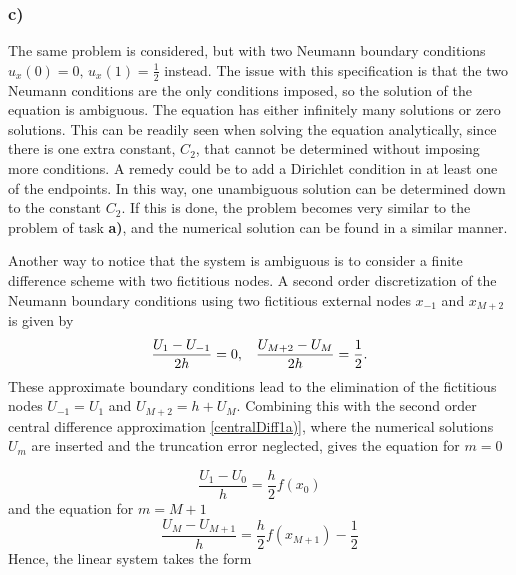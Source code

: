 \subsubsection{c)}

The same problem is considered, but with two Neumann boundary conditions $u_x(0) = 0, \, u_x(1) = \frac{1}{2}$ instead. The issue with this specification is that the two Neumann conditions are the only conditions imposed, so the solution of the equation is ambiguous. The equation has either infinitely many solutions or zero solutions. This can be readily seen when solving the equation analytically, since there is one extra constant, $C_2$, that cannot be determined without imposing more conditions. A remedy could be to add a Dirichlet condition in at least one of the endpoints. In this way, one unambiguous solution can be determined down to the constant $C_2$. If this is done, the problem becomes very similar to the problem of task \textbf{a)}, and the numerical solution can be found in a similar manner. 

Another way to notice that the system is ambiguous is to consider a finite difference scheme with two fictitious nodes. A second order discretization of the Neumann boundary conditions using two fictitious external nodes $x_{-1}$ and $x_{M+2}$ is given by 
\begin{equation*}
    \frac{U_{1}-U_{-1}}{2h} = 0, \hspace{3mm} \frac{U_{M+2}-U_{M}}{2h} = \frac12.
\end{equation*}
These approximate boundary conditions lead to the elimination of the fictitious nodes $U_{-1} = U_1$ and $U_{M+2} = h + U_M$. Combining this with the second order central difference approximation \eqref{centralDiff1a)}, where the numerical solutions $U_m$ are inserted and the truncation error neglected, gives the equation for $m = 0$ 

\begin{equation*}
    \frac{U_1 - U_0}{h} = \frac{h}{2}f(x_0)
\end{equation*}
and the equation for $m = M+1$ 
\begin{equation*}
    \frac{U_M-U_{M+1}}{h} = \frac{h}{2}f(x_{M+1}) - \frac{1}{2}
\end{equation*}
Hence, the linear system takes the form

